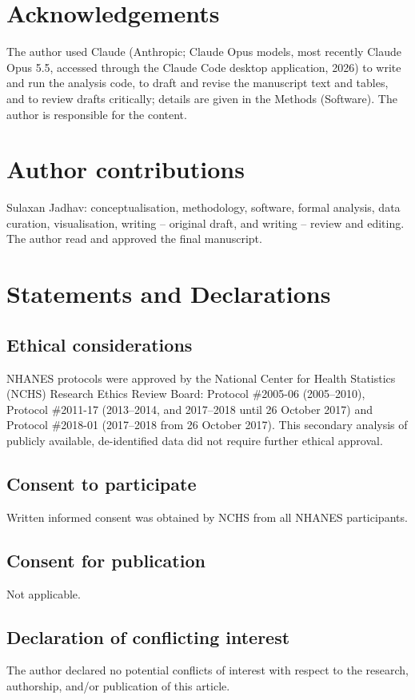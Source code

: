 \documentclass[11pt,a4paper]{article}
\begin{document}
\section*{Acknowledgements}
The author used Claude (Anthropic; Claude Opus models, most recently Claude Opus 5.5, accessed through the Claude Code desktop application, 2026) to write and run the analysis code, to draft and revise the manuscript text and tables, and to review drafts critically; details are given in the Methods (Software). The author is responsible for the content.

\section*{Author contributions}
Sulaxan Jadhav: conceptualisation, methodology, software, formal analysis, data curation, visualisation, writing -- original draft, and writing -- review and editing. The author read and approved the final manuscript.

\section*{Statements and Declarations}
\subsection*{Ethical considerations}
NHANES protocols were approved by the National Center for Health Statistics (NCHS) Research Ethics Review Board: Protocol \#2005-06 (2005--2010), Protocol \#2011-17 (2013--2014, and 2017--2018 until 26 October 2017) and Protocol \#2018-01 (2017--2018 from 26 October 2017). This secondary analysis of publicly available, de-identified data did not require further ethical approval.
\subsection*{Consent to participate}
Written informed consent was obtained by NCHS from all NHANES participants.
\subsection*{Consent for publication}
Not applicable.
\subsection*{Declaration of conflicting interest}
The author declared no potential conflicts of interest with respect to the research, authorship, and/or publication of this article.
\end{document}
